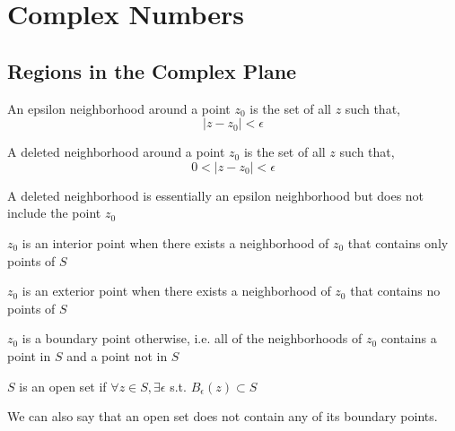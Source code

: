 

\chapter{Complex Numbers}
\setcounter{section}{11}
\section{Regions in the Complex Plane}

\begin{definition}
   
   An epsilon neighborhood around a point $z_0$ is the set of all  $z$ such that,
$$|z - z_0| < \epsilon$$   
\end{definition}

\begin{definition}
   A deleted neighborhood around a point $z_0$  is the set of all $z$ such that,
   $$0 < |z - z_0| < \epsilon$$
\end{definition}

\begin{remark}
A deleted neighborhood is essentially an epsilon neighborhood but does not include the point $z_0$
\end{remark}


\begin{definition}
$z_0$ is an interior point when there exists a neighborhood of $z_0$ that contains only points of $S$
\end{definition}

\begin{definition}
$z_0$ is an exterior point when there exists a neighborhood of $z_0$ that contains no points of $S$
\end{definition}


\begin{definition}
$z_0$ is a boundary point otherwise, i.e. all of the neighborhoods of $z_0$ contains a point in $S$ and a point not in $S$
\end{definition}

\begin{definition}
   $S$ is an open set if $\forall z \in S, \exists \epsilon$ s.t. $B_{\epsilon}(z) \subset S$ 
\end{definition}
\begin{remark}
   We can also say that an open set does not contain any of its boundary points.
\end{remark}

